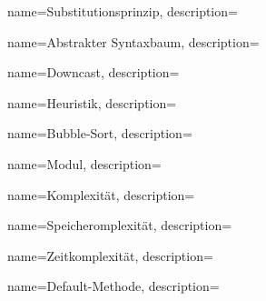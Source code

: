 {
    name=Substitutionsprinzip,
    description={}
}



{
    name=Abstrakter Syntaxbaum,
    description={}
}

{
    name=Downcast,
    description={}
}

{
    name=Heuristik,
    description={}
}

{
    name=Bubble-Sort,
    description={}
}

{
    name=Modul,
    description={}
}

{
    name=Komplexität,
    description={}
}


{
    name=Speicheromplexität,
    description={}
}


{
    name=Zeitkomplexität,
    description={}
}

{
    name=Default-Methode,
    description={}
}
